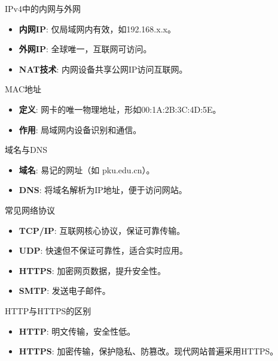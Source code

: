 \documentclass{beamer}
\begin{document}
\begin{frame}{IPv4中的内网与外网}
\begin{itemize}
    \item \textbf{内网IP}: 仅局域网内有效，如192.168.x.x。
    \item \textbf{外网IP}: 全球唯一，互联网可访问。
    \item \textbf{NAT技术}: 内网设备共享公网IP访问互联网。
\end{itemize}
\end{frame}

\begin{frame}{MAC地址}
\begin{itemize}
    \item \textbf{定义}: 网卡的唯一物理地址，形如00:1A:2B:3C:4D:5E。
    \item \textbf{作用}: 局域网内设备识别和通信。
\end{itemize}
\end{frame}

\begin{frame}{域名与DNS}
\begin{itemize}
    \item \textbf{域名}: 易记的网址（如 pku.edu.cn）。
    \item \textbf{DNS}: 将域名解析为IP地址，便于访问网站。
\end{itemize}
\end{frame}

\begin{frame}{常见网络协议}
\begin{itemize}
    \item \textbf{TCP/IP}: 互联网核心协议，保证可靠传输。
    \item \textbf{UDP}: 快速但不保证可靠性，适合实时应用。
    \item \textbf{HTTPS}: 加密网页数据，提升安全性。
    \item \textbf{SMTP}: 发送电子邮件。
\end{itemize}
\end{frame}

\begin{frame}{HTTP与HTTPS的区别}
\begin{itemize}
    \item \textbf{HTTP}: 明文传输，安全性低。
    \item \textbf{HTTPS}: 加密传输，保护隐私、防篡改。现代网站普遍采用HTTPS。
\end{itemize}
\end{frame}
\end{document}
